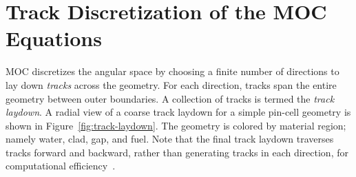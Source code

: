 \section{Track Discretization of the MOC Equations}
\label{sec:track-disceretization}

\ac{MOC} discretizes the angular space by choosing a finite number of directions to lay down \textit{tracks} across the geometry. For each direction, tracks span the entire geometry between outer boundaries. A collection of tracks is termed the \textit{track laydown}. A radial view of a coarse track laydown for a simple pin-cell geometry is shown in Figure~\ref{fig:track-laydown}. The geometry is colored by material region; namely water, clad, gap, and fuel. Note that the final track laydown traverses tracks forward and backward, rather than generating tracks in each direction, for computational efficiency~\cite{kochunas2007twoway}.



